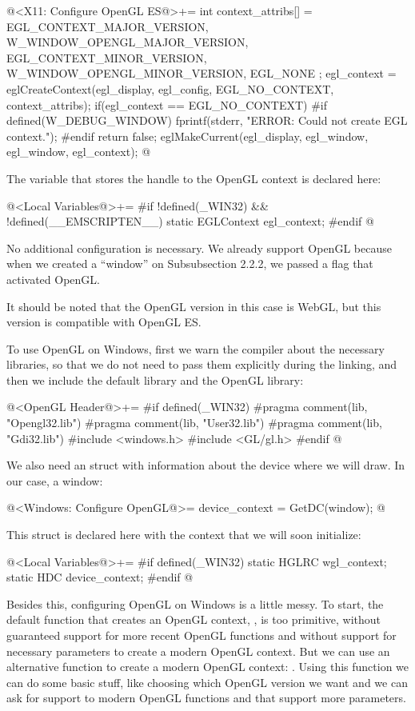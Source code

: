 \iniciocodigo
@<X11: Configure OpenGL ES@>+=
{
  int context_attribs[] = {
    EGL_CONTEXT_MAJOR_VERSION, W_WINDOW_OPENGL_MAJOR_VERSION,
    EGL_CONTEXT_MINOR_VERSION, W_WINDOW_OPENGL_MINOR_VERSION,
    EGL_NONE
  };
  egl_context = eglCreateContext(egl_display, egl_config,
                                 EGL_NO_CONTEXT, context_attribs);
  if(egl_context == EGL_NO_CONTEXT){
#if defined(W_DEBUG_WINDOW)
    fprintf(stderr, "ERROR: Could not create EGL context.\n");
#endif
    return false;
  }
  eglMakeCurrent(egl_display, egl_window, egl_window, egl_context);
}
@
\fimcodigo

The variable that stores the handle to the OpenGL context is declared
here:

\iniciocodigo
@<Local Variables@>+=
#if !defined(_WIN32) && !defined(__EMSCRIPTEN__)
static EGLContext egl_context;
#endif
@
\fimcodigo


No additional configuration is necessary. We already support OpenGL
because when we created a ``window'' on Subsubsection 2.2.2, we passed
a flag that activated OpenGL.

It should be noted that the OpenGL version in this case is WebGL, but
this version is compatible with OpenGL ES.


To use OpenGL on Windows, first we warn the compiler about the
necessary libraries, so that we do not need to pass them explicitly
during the linking, and then we include the default library and the
OpenGL library:

\iniciocodigo
@<OpenGL Header@>+=
#if defined(_WIN32)
#pragma comment(lib, "Opengl32.lib")
#pragma comment(lib, "User32.lib")
#pragma comment(lib, "Gdi32.lib")
#include <windows.h>
#include <GL/gl.h>
#endif
@
\fimcodigo

We also need an struct with information about the device where we will
draw. In our case, a window:

\iniciocodigo
@<Windows: Configure OpenGL@>=
device_context = GetDC(window);
@
\fimcodigo

This struct is declared here with the context that we will soon initialize:

\iniciocodigo
@<Local Variables@>+=
#if defined(_WIN32)
static HGLRC wgl_context;
static HDC device_context;
#endif
@
\fimcodigo

Besides this, configuring OpenGL on Windows is a little messy. To
start, the default function that creates an OpenGL
context, , is too primitive, without
guaranteed support for more recent OpenGL functions and without
support for necessary parameters to create a modern OpenGL
context. But we can use an alternative function to create a modern
OpenGL context: . Using this
function we can do some basic stuff, like choosing which OpenGL
version we want and we can ask for support to modern OpenGL functions
and that support more parameters.

